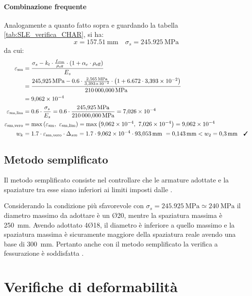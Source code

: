  \paragraph{Combinazione frequente}
 Analogamente a quanto fatto sopra e guardando la tabella \ref{tab:SLE_verifica_CHAR}, si ha:
\[
    x = \SI{157.51}{\milli\metre} \quad \sigma_{s} = \SI{245.925}{\mega\pascal}
\] 
da cui:
\[
\begin{split}
    \varepsilon_\textup{sm} 
    &= \frac{ \sigma_{s} - k_{t} \cdot \frac{ f_\textup{ctm} }{ \rho_\textup{eff} } \cdot \left( 1 + \alpha_{e} \cdot \rho_\textup{eff} \right) }{ E_{s} }  \\
    &= \frac{ \SI{245.925}{\mega\pascal} - 0.6 \cdot \frac{ \SI{2.565}{\mega\pascal} }{\num{3.393e-2 } } \cdot \left( 1 + 6.672 \cdot\num{3.393e-2 } \right) }{ \SI{210000.000}{\mega\pascal} } \\
    &=\num{9.062e-4 }  \\
    \varepsilon_\textup{sm,lim} 
    &= 0.6 \cdot \frac{ \sigma_{s} }{ E_{s} }  
    = 0.6 \cdot \frac{ \SI{245.925}{\mega\pascal} }{ \SI{210000.000}{\mega\pascal} } 
    =\num{7.026e-4 }  \\
    \varepsilon_\textup{sm,vero} 
    &= \max { \left( \varepsilon_\textup{sm} ,\  \varepsilon_\textup{sm,lim} \right) }  
    = \max { \left(\num{9.062e-4 } ,\ \num{7.026e-4 } \right) } 
    =\num{9.062e-4 }  \\
    w_{k} 
    &= 1.7 \cdot \varepsilon_\textup{sm,vero} \cdot \Delta_{sm}  
    =  1.7 \cdot\num{9.062e-4 } \cdot \SI{93.053}{\milli\metre} \ 
    = \SI{0.143}{\milli\metre}  < w_2 = \SI{0.3}{\milli\metre} \quad \checked\\
\end{split}
\]
\subsection{Metodo semplificato}
Il metodo semplificato consiste nel controllare che le armature adottate e la spaziature tra esse siano inferiori ai limiti imposti dalle .

Considerando la condizione più sfavorevole con $\sigma_{s} = \SI{245.925}{\mega\pascal} \simeq \SI{240}{\mega\pascal}$ il diametro massimo da adottare è un Ø20, mentre la spaziatura massima è \SI{250}{\milli\metre}. 
Avendo adottato 4Ø18, il diametro è inferiore a quello massimo e la spaziatura massima è sicuramente maggiore della spaziatura reale avendo una base di \SI{300}{\milli\metre}. 
Pertanto anche con il metodo semplificato la verifica a fessurazione è soddisfatta \checked.

\section{Verifiche di deformabilità}